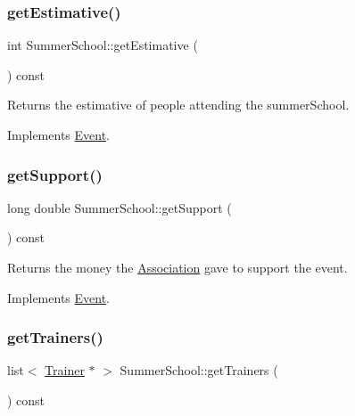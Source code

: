 \subsubsection{\texorpdfstring{get\+Estimative()}{getEstimative()}}
{\footnotesize\ttfamily int Summer\+School\+::get\+Estimative (\begin{DoxyParamCaption}{ }\end{DoxyParamCaption}) const\hspace{0.3cm}{\ttfamily [virtual]}}



Returns the estimative of people attending the summer\+School. 



Implements \mbox{\hyperlink{classEvent_a18ac55c239f648fc0ad5687c426f2a8f}{Event}}.

\mbox{\label{classSummerSchool_a86f34a2f39dcd33171e77c386165219c}} 
\subsubsection{\texorpdfstring{get\+Support()}{getSupport()}}
{\footnotesize\ttfamily long double Summer\+School\+::get\+Support (\begin{DoxyParamCaption}{ }\end{DoxyParamCaption}) const\hspace{0.3cm}{\ttfamily [virtual]}}



Returns the money the \mbox{\hyperlink{classAssociation}{Association}} gave to support the event. 



Implements \mbox{\hyperlink{classEvent_a9170bfcbd9b00015dafc5d5cc69a2cfe}{Event}}.

\mbox{\label{classSummerSchool_aba18410ee9fbafd26858232104b5b39f}} 
\subsubsection{\texorpdfstring{get\+Trainers()}{getTrainers()}}
{\footnotesize\ttfamily list$<$ \mbox{\hyperlink{classTrainer}{Trainer}} $\ast$ $>$ Summer\+School\+::get\+Trainers (\begin{DoxyParamCaption}{ }\end{DoxyParamCaption}) const\hspace{0.3cm}{\ttfamily [virtual]}}



